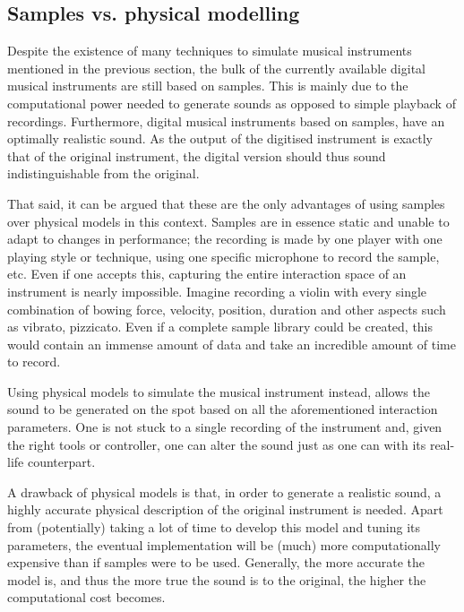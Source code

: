 \subsection{Samples vs. physical modelling}
Despite the existence of many techniques to simulate musical instruments mentioned in the previous section, the bulk of the currently available digital musical instruments are still based on samples. This is mainly due to the computational power needed to generate sounds as opposed to simple playback of recordings. Furthermore, digital musical instruments based on samples, have an optimally realistic sound. As the output of the digitised instrument is exactly that of the original instrument, the digital version should thus sound indistinguishable from the original.

That said, it can be argued that these are the only advantages of using samples over physical models in this context. Samples are in essence static and unable to adapt to changes in performance; the recording is made by one player with one playing style or technique, using one specific microphone to record the sample, etc. Even if one accepts this, capturing the entire interaction space of an instrument is nearly impossible. Imagine recording a violin with every single combination of bowing force, velocity, position, duration and other aspects such as vibrato, pizzicato. Even if a complete sample library could be created, this would contain an immense amount of data and take an incredible amount of time to record. 

Using physical models to simulate the musical instrument instead, allows the sound to be generated on the spot based on all the aforementioned interaction parameters. One is not stuck to a single recording of the instrument and, given the right tools or controller, one can alter the sound just as one can with its real-life counterpart.

A drawback of physical models is that, in order to generate a realistic sound, a highly accurate physical description of the original instrument is needed. Apart from (potentially) taking a lot of time to develop this model and tuning its parameters, the eventual implementation will be (much) more computationally expensive than if samples were to be used. Generally, the more accurate the model is, and thus the more true the sound is to the original, the higher the computational cost becomes. 

